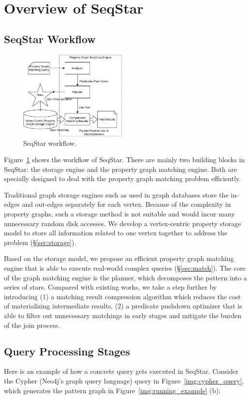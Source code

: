 \section{Overview of SeqStar}\label{sec:framework}
\subsection{SeqStar Workflow}
\begin{figure}[ht]
  \centering
  \includegraphics[width=0.48\textwidth]{img/architecture.pdf}
  \caption{SeqStar workflow.}\label{img:architecture}
\end{figure}
Figure~\ref{img:architecture} shows the workflow of SeqStar. There are mainly two building blocks in SeqStar: the storage engine and the property graph matching engine.
Both are specially designed to deal with the property graph matching problem efficiently.

Traditional graph storage engines such as used in graph databases store the in-edges and out-edges separately for each vertex.
Because of the complexity in property graphs,
such a storage method is not suitable and would incur many unnecessary random disk accesses.
We develop a vertex-centric property storage model to store all information related to one vertex together to address the problem (\S\ref{sec:storage}).


Based on the storage model,
we propose an efficient property graph matching engine that is able to execute real-world complex queries (\S\ref{sec:match}).
The core of the graph matching engine is the planner, which  decomposes the pattern into a series of stars.
Compared with existing works, we take a step further by introducing
(1) a matching result compression algorithm which reduces the cost of materializing intermediate results,
(2) a predicate pushdown optimizer that is able to filter out unnecessary matchings in early stages and mitigate the burden of the join process.
\subsection{Query Processing Stages}
Here is an example of how a concrete query gets executed in SeqStar.
Consider the Cypher (Neo4j's graph query language) query in Figure~\ref{img:cypher_query},
which generates the pattern graph in Figure~\ref{img:running_example} (b):

